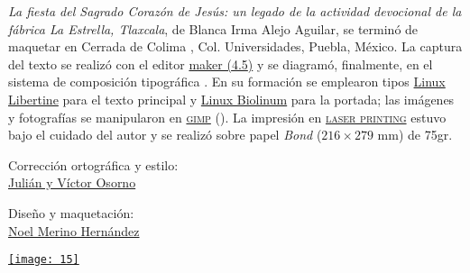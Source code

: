 \documentclass[14pt,letterpaper,twoside]{extbook} %
\begin{document}
\begin{center}
\begin{minipage}{5cm}
\footnotesize \textit{La fiesta del Sagrado Corazón de Jesús: un legado de la actividad devocional de la fábrica La Estrella, Tlaxcala}, de Blanca Irma Alejo Aguilar, se terminó de maquetar en Cerrada de Colima , Col. Universidades, Puebla, México. La captura del texto se realizó con el editor \href{https://www.xm1math.net/texmaker/}{maker (\textsc{4.5})} y se diagramó, finalmente, en el sistema de composición tipográfica \href{https://www.latex-project.org/}{}.  En su formación se emplearon tipos \href{https://es.wikipedia.org/wiki/Linux_Libertine}{Linux Libertine} para el texto principal y \textsf{\href{http://libertine-fonts.org/}{Linux Biolinum}} para la portada; las imágenes y fotografías se manipularon en \textsc{\href{https://www.gimp.org/}{gimp}} (). La impresión en \href{https://en.wikipedia.org/wiki/Laser_printing}{\textsc{laser printing}} estuvo bajo el cuidado del autor y se realizó sobre papel \emph{Bond} ($216 \times 279 $ mm) de 75\thinspace gr.
\end{minipage}
\end{center}
\begin{center}
\footnotesize Corrección ortográfica y estilo: \\ \href{julian2che@gmail.com}{Julián y Víctor Osorno}
\end{center}
\begin{center}
\footnotesize Diseño y maquetación: \\ \href{noel_merino@yahoo.com.mx}{Noel Merino Hernández}
\end{center}
\begin{center}
\href{https://www.xm1math.net/texmaker/}{\texttt{[image: 15]}}
\end{center}
\begin{center}
\huge \href{https://www.latex-project.org/}{}
\end{center}
\end{document}
